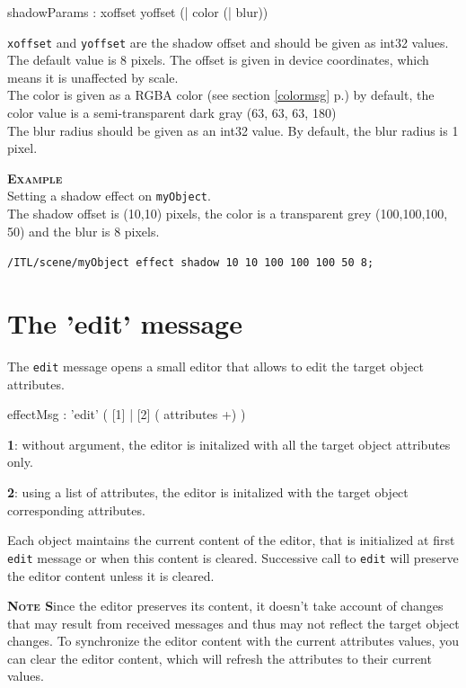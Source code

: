 \documentclass[a4paper,twoside]{report}
\newcommand{\sublevel}[1]	{\section{#1}}
\newcommand{\fullref}[1]	{\ref{#1} p.\pageref{#1}}
\newcommand{\OSC}[1]		{\texttt{#1}}
\newcommand{\example}		{\textbf{\hspace{-1.5cm}\textbf{\textsc{Example }}}}
\newcommand{\note}	[1]		{\vspace{2mm}\textbf{\hspace{-0.9cm}\textbf{\textsc{Note #1}}}}
\let\olditemize\itemize
\let\oldenditemize\enditemize
\renewenvironment{itemize} 	{\olditemize \setlength{\itemsep}{1mm}}{\oldenditemize}
\newcommand{\sample}	[1]			{\vspace{-2mm}\begin{center}\colorbox{mygrey}{
								\begin{minipage}[t]{0.9\columnwidth} 
								{\small \texttt{#1}}
								\end{minipage}}\end{center}}
\begin{document}
\begin{rail}
shadowParams : xoffset yoffset (| color (| blur))
\end{rail}

\OSC{xoffset} and \OSC{yoffset} are the shadow offset and should be given as int32 values. The default value is 8 pixels. The offset is given in device coordinates, which means it is unaffected by scale. \\
The color is given as a RGBA color (see section \fullref{colormsg}) by default, the color value is a semi-transparent dark gray (63, 63, 63, 180) \\
The blur radius should be given as an int32 value. By default, the blur radius is 1 pixel.

\example \\
Setting a shadow effect on \OSC{myObject}. \\
The shadow offset is (10,10) pixels, the color is a transparent grey (100,100,100, 50) and the blur is 8 pixels.
\sample{/ITL/scene/myObject effect shadow 10 10 100 100 100 50 8;}

\sublevel{The 'edit' message}
\label{editmsg}

The \OSC{edit} message opens a small editor that allows to edit the target object attributes.

\begin{rail}
effectMsg : 'edit' ( [1] | 
					 [2] ( attributes +) )
\end{rail}

\begin{itemize}
\item \textbf{1}: without argument, the editor is initalized with all the target object attributes only.
\item \textbf{2}: using a list of attributes, the editor is initalized with the target object corresponding attributes.
\end{itemize}

Each object maintains the current content of the editor, that is initialized at first \OSC{edit} message or when this content is cleared. Successive call to \OSC{edit} will preserve the editor content unless it is cleared.

\note Since the editor preserves its content, it doesn't take account of changes that may result from received messages and thus may not reflect the target object changes. To synchronize the editor content with the current attributes values, you can clear the editor content, which will refresh the attributes to their current values.
\end{document}
